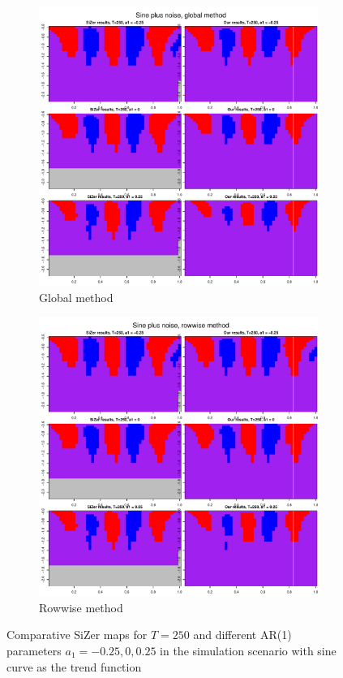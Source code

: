 \documentclass[a4paper,12pt]{article}
\begin{document}
\begin{figure}[t!]
\begin{subfigure}[b]{0.475\textwidth}
\includegraphics[width=\textwidth]{Plots/SiZer_comparison_sin_global_T_250.pdf}
\caption{Global method}
\end{subfigure}\hspace{0.25cm}
\begin{subfigure}[b]{0.475\textwidth}
\includegraphics[width=\textwidth]{Plots/SiZer_comparison_sin_rowwise_T_250.pdf}
\caption{Rowwise method}
\end{subfigure}
\caption{Comparative SiZer maps for $T = 250$ and different AR(1) parameters $a_1 = -0.25, 0, 0.25$ in the simulation scenario with sine curve as the trend function}\label{fig:SiZer_maps_comparison_null}
\end{figure}
\end{document}
